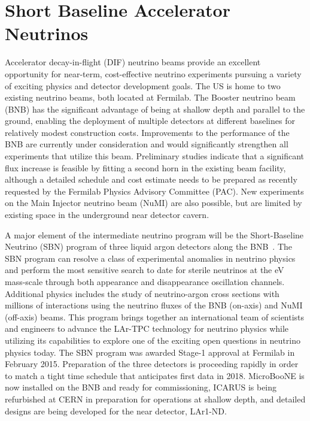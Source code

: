 \section{Short Baseline Accelerator Neutrinos}
\label{sec:AcceleratorSB}

Accelerator decay-in-flight (DIF) neutrino beams provide an excellent
opportunity for near-term, cost-effective neutrino experiments
pursuing a variety of exciting physics and detector development goals.
The US is home to two existing neutrino beams, both located at
Fermilab.  The Booster neutrino beam (BNB) has the significant
advantage of being at shallow depth and parallel to the ground,
enabling the deployment of multiple detectors at different baselines
for relatively modest construction costs.  Improvements to the
performance of the BNB are currently under consideration and would
significantly strengthen all experiments that utilize this beam.
Preliminary studies indicate that a significant flux increase is
feasible by fitting a second horn in the existing beam facility,
although a detailed schedule and cost estimate needs to be prepared as
recently requested by the Fermilab Physics Advisory Committee
(PAC). New experiments on the Main Injector neutrino beam (NuMI) are
also possible, but are limited by existing space in the underground
near detector cavern.

A major element of the intermediate neutrino program will be the
Short-Baseline Neutrino (SBN) program of three liquid argon detectors
along the BNB~\cite{SBNProposal}.  The SBN program can resolve a class
of experimental anomalies in neutrino physics and perform the most
sensitive search to date for sterile neutrinos at the eV mass-scale
through both appearance and disappearance oscillation
channels. Additional physics includes the study of neutrino-argon
cross sections with millions of interactions using the neutrino fluxes
of the BNB (on-axis) and NuMI (off-axis) beams.  This program brings
together an international team of scientists and engineers to advance
the LAr-TPC technology for neutrino physics while utilizing its
capabilities to explore one of the exciting open questions in neutrino
physics today.  The SBN program was awarded Stage-1 approval at
Fermilab in February 2015.  Preparation of the three detectors is
proceeding rapidly in order to match a tight time schedule that
anticipates first data in 2018.  MicroBooNE is now installed on the
BNB and ready for commissioning, ICARUS is being refurbished at CERN
in preparation for operations at shallow depth, and detailed designs
are being developed for the near detector, LAr1-ND.

